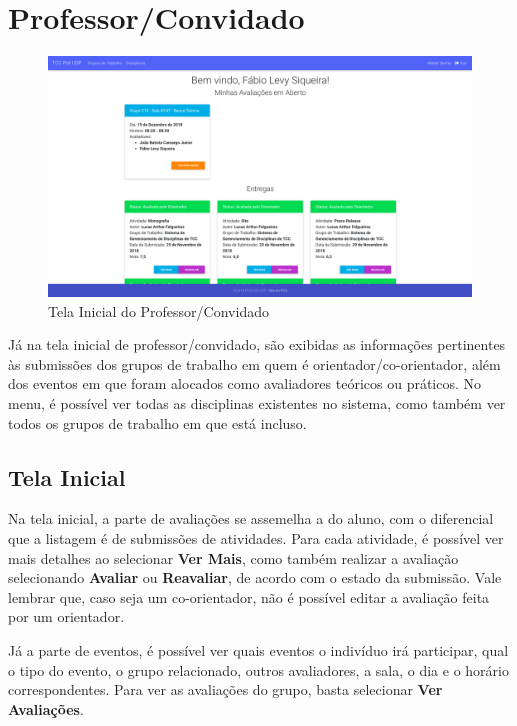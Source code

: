 \section{Professor/Convidado}
\begin{figure}[H]
    \centering
    \includegraphics[scale=0.3]{imagens/tela_inicial_professor.png}
    \caption{Tela Inicial do Professor/Convidado}
    \label{fig:initial-screen-staff}
\end{figure}

Já na tela inicial de professor/convidado, são exibidas as informações pertinentes às submissões dos grupos de trabalho em quem é orientador/co-orientador, além dos eventos em que foram alocados como avaliadores teóricos ou práticos. No menu, é possível ver todas as disciplinas existentes no sistema, como também ver todos os grupos de trabalho em que está incluso.

\subsection{Tela Inicial}
Na tela inicial, a parte de avaliações se assemelha a do aluno, com o diferencial que a listagem é de submissões de atividades. Para cada atividade, é possível ver mais detalhes ao selecionar \textbf{Ver Mais}, como também realizar a avaliação selecionando \textbf{Avaliar} ou \textbf{Reavaliar}, de acordo com o estado da submissão. Vale lembrar que, caso seja um co-orientador, não é possível editar a avaliação feita por um orientador.

Já a parte de eventos, é possível ver quais eventos o indivíduo irá participar, qual o tipo do evento, o grupo relacionado, outros avaliadores, a sala, o dia e o horário correspondentes. Para ver as avaliações do grupo, basta selecionar \textbf{Ver Avaliações}.

